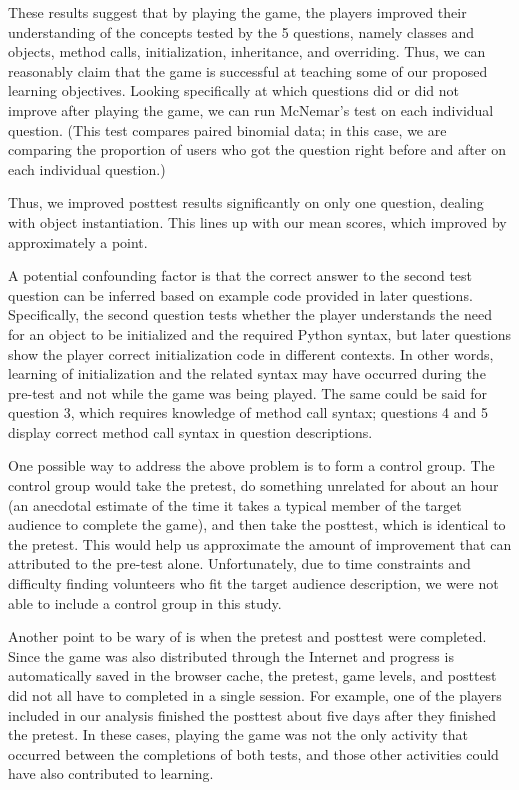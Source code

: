 \documentclass[12pt,notitlepage]{article}
\begin{document}
These results suggest that by playing the game, the players improved
their understanding of the concepts tested by the 5 questions, namely
classes and objects, method calls, initialization, inheritance, and
overriding. Thus, we can reasonably claim that the game is successful
at teaching some of our proposed learning objectives. Looking
specifically at which questions did or did not improve after playing
the game, we can run McNemar's test on each individual question. (This
test compares paired binomial data; in this case, we are comparing the
proportion of users who got the question right before and after on
each individual question.)


Thus, we improved posttest results significantly on only one question,
dealing with object instantiation. This lines up with our mean scores,
which improved by approximately a point.

A potential confounding factor is that the correct answer to the second
test question can be inferred based on example code provided in later
questions. Specifically, the second question tests whether the player
understands the need for an object to be initialized and the required Python
syntax, but later questions show the player correct initialization code in
different contexts. In other words, learning of initialization and the related
syntax may have occurred during the pre-test and not while the game was being
played. The same could be said for question 3, which requires knowledge of
method call syntax; questions 4 and 5 display correct method call syntax in
question descriptions.

One possible way to address the above problem is to form a control group.
The control group would take the pretest, do something unrelated for about
an hour (an anecdotal estimate of the time it takes a typical member of the
target audience to complete the game), and then take the posttest, which is
identical to the pretest. This would help us approximate the amount of
improvement that can attributed to the pre-test alone. Unfortunately, due to
time constraints and difficulty finding volunteers who fit the target audience
description, we were not able to include a control group in this study.

Another point to be wary of is when the pretest and posttest were completed.
Since the game was also distributed through the Internet and progress is
automatically saved in the browser cache, the pretest, game levels, and
posttest did not all have to completed in a single session. For example, one of
the players included in our analysis finished the posttest about five days
after they finished the pretest. In these cases, playing the game was not the
only activity that occurred between the completions of both tests, and those
other activities could have also contributed to learning.
\end{document}
